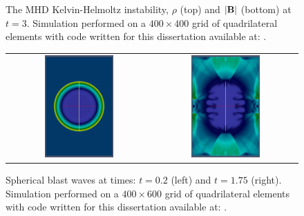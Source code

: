 \begin{figure}[htbp]
\begin{center}
\begin{tabular}{c}
\end{tabular}
\caption{The MHD Kelvin-Helmoltz instability, $\rho$ (top) and $|\mathbf{B}|$ (bottom) at $t=3$.  Simulation performed on a $400 \times 400$ grid of quadrilateral elements with code written for this dissertation available at: \protect\gitrepo.}
\end{center} 
\label{fig:kh_instability_mhd}
\figSpace
\end{figure}

\begin{figure}[htbp]\figSpace 
\begin{tabular}{cc}
\includegraphics[width=0.5\textwidth]{fig/bw0020.jpg} & 
\includegraphics[width=0.5\textwidth]{fig/bw0175.jpg} 
\end{tabular}
\caption{Spherical blast waves at times: $t=0.2$ (left) and $t=1.75$ (right).  Simulation performed on a $400 \times 600$ grid of quadrilateral elements with code written for this dissertation available at: \protect\gitrepo.}
\label{fig:blast_waves}
\figSpace
\end{figure}

